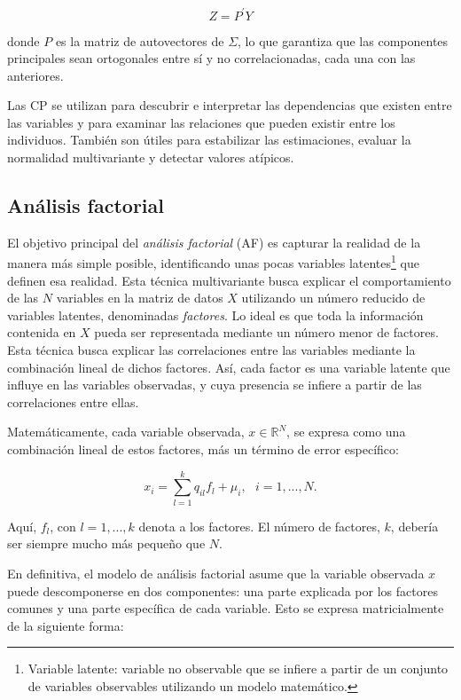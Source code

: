 \[
Z=P^{'}Y
\]

donde $P$ es la matriz de autovectores de $\Sigma$, lo que garantiza que las componentes principales sean ortogonales entre sí y no 
correlacionadas, cada una con las anteriores. \newline

Las CP se utilizan para descubrir e interpretar las dependencias que existen entre las variables y para examinar las relaciones
que pueden existir entre los individuos. También son útiles para estabilizar las estimaciones, evaluar la normalidad
multivariante y detectar valores atípicos. \newline


\subsection{Análisis factorial}

El objetivo principal del \textit{análisis factorial} (AF) es capturar la realidad de la manera más simple posible, identificando 
unas pocas variables latentes\footnote[8]{Variable latente: variable no observable que se infiere a partir de un conjunto de variables 
observables utilizando un modelo matemático. } que definen esa realidad. Esta técnica multivariante busca explicar el comportamiento de las $N$ 
variables en la matriz de datos $X$ utilizando un número reducido de variables latentes, denominadas \textit{factores}. Lo ideal es que toda 
la información contenida en $X$ pueda ser representada mediante un número menor de factores. Esta técnica busca explicar las correlaciones 
entre las variables mediante la combinación lineal de dichos factores. Así, cada factor es una variable latente que 
influye en las variables observadas, y cuya presencia se infiere a partir de las correlaciones entre ellas. \newline

Matemáticamente, cada variable observada, $x\in \mathbb{R}^{N}$, 
se expresa como una combinación lineal de estos factores, más un término de error específico:

\[
x_{i} = \sum_{l=1}^{k}q_{il}f_{l} + \mu_{i}, \text{ } i=1,...,N.
\]

Aquí, $f_{l}$, con $l=1,...,k$ denota a los factores. El número de factores, $k$, debería ser siempre mucho más pequeño que $N$. \newline

En definitiva, el modelo de análisis factorial asume que la variable observada $x$ puede descomponerse en dos componentes: una parte explicada
por los factores comunes y una parte específica de cada variable. Esto se expresa matricialmente de la siguiente forma:

